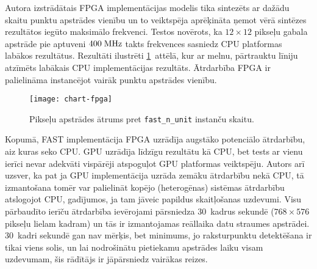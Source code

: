 Autora izstrādātais FPGA implementācijas modelis tika sintezēts ar
dažādu skaitu punktu apstrādes vienību un to veiktspēja aprēķināta
ņemot vērā sintēzes rezultātos iegūto maksimālo frekvenci.
Testos novērots, ka $12 \times 12$ pikseļu gabala apstrāde pie
aptuveni $400\;\mathrm{MHz}$ takts frekvences sasniedz CPU platformas
labākos rezultātus.
Rezultāti ilustrēti \ref{fig:test3-data-txt}~attēlā, kur ar
melnu, pārtrauktu līniju atzīmēts labākais
CPU implementācijas rezultāts. Ātrdarbība FPGA ir palielināma
instancējot vairāk punktu apstrādes vienību.

\begin{figure}[tbh]
	\centering
	\texttt{[image: chart-fpga]}
	\caption{Pikseļu apstrādes ātrums pret \texttt{fast\_n\_unit} instanču skaitu.}
	\label{fig:test3-data-txt}
\end{figure}

Kopumā, FAST implementācija FPGA uzrādīja augstāko potenciālo ātrdarbību,
aiz kuras seko CPU. GPU uzrādīja līdzīgu rezultātu kā CPU, bet tests ar
vienu ierīci nevar adekvāti vispārēji atspoguļot GPU platformas veiktspēju.
Autors arī uzsver,
ka pat ja GPU implementācija uzrāda zemāku ātrdarbību nekā CPU, tā
izmantošana tomēr var palielināt kopējo (heterogēnas) sistēmas ātrdarbību
atslogojot CPU, gadījumos, ja tam jāveic papildus skaitļošanas uzdevumi.
Visu pārbaudīto ierīču ātrdarbība ievērojami pārsniedza
30~kadrus sekundē ($768 \times 576$ pikseļu lielam kadram) 
un tās ir izmantojamas reāllaika datu
straumes apstrādei. 30~kadri sekundē gan nav mērķis, bet minimums, jo
raksturpunktu detektēšana ir tikai viens solis, un lai nodrošinātu
pietiekamu apstrādes laiku visam uzdevumam, šis rādītājs ir jāpārsniedz
vairākas reizes.
